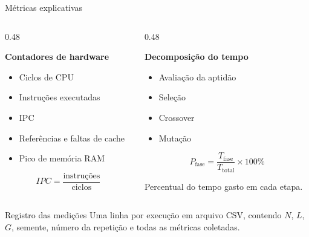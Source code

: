 \documentclass[aspectratio=169,11pt]{beamer}
\begin{document}

\begin{frame}{Métricas explicativas}

    \begin{columns}[T,onlytextwidth]

        \begin{column}{0.48\textwidth}

            \textbf{Contadores de hardware}

            \begin{itemize}
                \item Ciclos de CPU
                \item Instruções executadas
                \item IPC
                \item Referências e faltas de cache
                \item Pico de memória RAM
            \end{itemize}

            \[
                IPC =
                \frac{\text{instruções}}
                     {\text{ciclos}}
            \]

        \end{column}

        \begin{column}{0.48\textwidth}

            \textbf{Decomposição do tempo}

            \begin{itemize}
                \item Avaliação da aptidão
                \item Seleção
                \item Crossover
                \item Mutação
            \end{itemize}

            \[
                P_{\text{fase}}
                =
                \frac{T_{\text{fase}}}
                     {T_{\text{total}}}
                \times 100\%
            \]

            \begin{center}
                \small
                Percentual do tempo gasto em cada etapa.
            \end{center}

        \end{column}

    \end{columns}

    \vspace{0.08cm}

    \begin{questionbox}{Registro das medições}
        Uma linha por execução em arquivo CSV, contendo
        $N$, $L$, $G$, semente, número da repetição e todas
        as métricas coletadas.
    \end{questionbox}

\end{frame}
\end{document}
